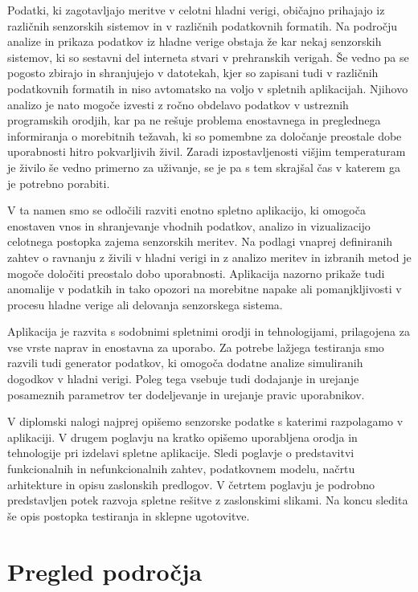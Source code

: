 \documentclass[a4paper, 12pt]{book}
\begin{document}
Podatki, ki zagotavljajo meritve v celotni hladni verigi, običajno prihajajo iz različnih senzorskih sistemov in v različnih podatkovnih formatih. Na področju analize in prikaza podatkov iz hladne verige obstaja že kar nekaj senzorskih sistemov, ki so sestavni del interneta stvari v prehranskih verigah. Še vedno pa se pogosto zbirajo in shranjujejo v datotekah, kjer so zapisani tudi v različnih podatkovnih formatih in  niso avtomatsko na voljo v spletnih aplikacijah. Njihovo analizo je nato mogoče izvesti z ročno obdelavo podatkov v ustreznih programskih orodjih, kar pa ne rešuje problema enostavnega in preglednega informiranja o morebitnih težavah, ki so pomembne za določanje preostale dobe uporabnosti hitro pokvarljivih živil. Zaradi izpostavljenosti višjim temperaturam je živilo še vedno primerno za uživanje, se je pa s tem skrajšal čas v katerem ga je potrebno porabiti. 

V ta namen smo se odločili razviti enotno spletno aplikacijo, ki omogoča enostaven vnos in shranjevanje vhodnih podatkov, analizo in vizualizacijo celotnega postopka zajema senzorskih meritev. Na podlagi vnaprej definiranih zahtev o ravnanju z živili v hladni verigi in z analizo meritev in izbranih metod je mogoče določiti preostalo dobo uporabnosti. Aplikacija nazorno prikaže tudi anomalije v podatkih in tako opozori na morebitne napake ali pomanjkljivosti v procesu hladne verige ali delovanja senzorskega sistema.

Aplikacija je razvita s sodobnimi spletnimi orodji in tehnologijami, prilagojena za vse vrste naprav in enostavna za uporabo. Za potrebe lažjega testiranja smo razvili tudi generator podatkov, ki omogoča dodatne analize simuliranih dogodkov v hladni verigi. Poleg tega vsebuje tudi dodajanje in urejanje posameznih parametrov ter dodeljevanje in urejanje pravic uporabnikov.

V diplomski nalogi najprej opišemo senzorske podatke s katerimi razpolagamo v aplikaciji. V drugem poglavju na kratko opišemo uporabljena orodja in tehnologije pri izdelavi spletne aplikacije. Sledi poglavje o predstavitvi funkcionalnih in nefunkcionalnih zahtev, podatkovnem modelu, načrtu arhitekture in opisu zaslonskih predlogov. V četrtem poglavju je podrobno predstavljen potek razvoja spletne rešitve z zaslonskimi slikami. Na koncu sledita še opis postopka testiranja in sklepne ugotovitve.



\chapter{Pregled področja}
\label{pregled-podrocja}
\end{document}
